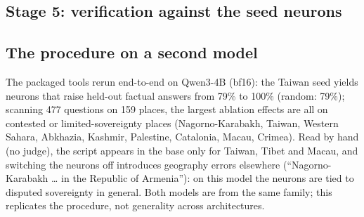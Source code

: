 \documentclass[10pt,a4paper]{article}
\begin{document}
\subsection{Stage 5: verification against the seed neurons}


\subsection{The procedure on a second model}
The packaged tools rerun end-to-end on Qwen3-4B (bf16): the Taiwan seed yields neurons that raise held-out factual answers
from 79\% to 100\% (random: 79\%); scanning 477 questions on 159 places, the largest ablation effects are all on contested
or limited-sovereignty places (Nagorno-Karabakh, Taiwan, Western Sahara, Abkhazia, Kashmir, Palestine, Catalonia, Macau,
Crimea). Read by hand (no judge), the script appears in the base only for Taiwan, Tibet and Macau, and switching the neurons
off introduces geography errors elsewhere (``Nagorno-Karabakh \ldots{} in the Republic of Armenia''): on this model the
neurons are tied to disputed sovereignty in general. Both models are from the same family; this replicates the procedure,
not generality across architectures.
\end{document}
